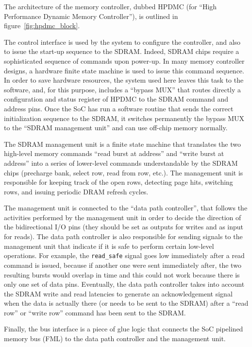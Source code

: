 \documentclass[a4paper,11pt]{kthesis}
\begin{document}
The architecture of the memory controller, dubbed HPDMC (for ``High Performance Dynamic Memory Controller''), is outlined in figure~\ref{fig:hpdmc_block}.

The control interface is used by the system to configure the controller, and also to issue the start-up sequence to the SDRAM. Indeed, SDRAM chips require a sophisticated sequence of commands upon power-up. In many memory controller designs, a hardware finite state machine is used to issue this command sequence. In order to save hardware resources, the system used  here leaves this task to the software, and, for this purpose, includes a ``bypass MUX'' that routes directly a configuration and status register of HPDMC to the SDRAM command and address pins. Once the SoC has run a software routine that sends the correct initialization sequence to the SDRAM, it switches permanently the bypass MUX to the ``SDRAM management unit'' and can use off-chip memory normally.

The SDRAM management unit is a finite state machine that translates the two high-level memory commands ``read burst at address'' and ``write burst at address'' into a series of lower-level commands understandable by the SDRAM chips (precharge bank, select row, read from row, etc.). The management unit is responsible for keeping track of the open rows, detecting page hits, switching rows, and issuing periodic DRAM refresh cycles.

The management unit is connected to the ``data path controller'', that follows the activities performed by the management unit in order to decide the direction of the bidirectional I/O pins (they should be set as outputs for writes and as input for reads). The data path controller is also responsible for sending signals to the management unit that indicate if it is safe to perform certain low-level operations. For example, the \verb!read_safe! signal goes low immediately after a read command is issued, because if another one were sent immediately after, the two resulting bursts would overlap in time and this could not work because there is only one set of data pins. Eventually, the data path controller takes into account the SDRAM write and read latencies to generate an acknowledgement signal when the data is actually there (or needs to be sent to the SDRAM) after a ``read row'' or ``write row'' command has been sent to the SDRAM.

Finally, the bus interface is a piece of glue logic that connects the SoC pipelined memory bus (FML) to the data path controller and the management unit.
\end{document}
